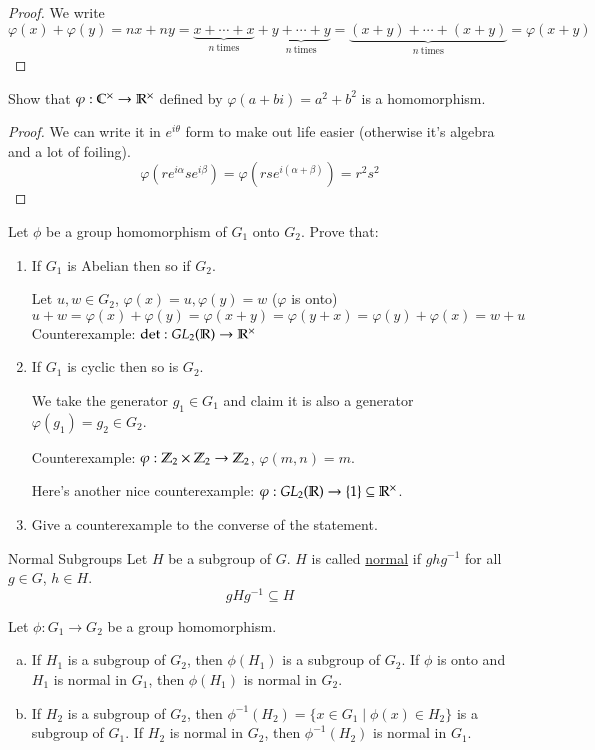 \begin{proof}
	We write
	\[\varphi(x)+\varphi(y) = nx + ny = \underbrace{x + \cdots + x}_{n\ \text{times}} + \underbrace{y + \cdots + y}_{n\ \text{times}} = \underbrace{(x+y) + \cdots + (x+y)}_{n\ \text{times}}=\varphi(x + y)\]
\end{proof}

 Show that $\varphi:\mathbb{C}^\times \to \mathbb{R}^\times$ defined by $\varphi(a+bi) = a^2+b^2$ is a homomorphism. 

\begin{proof}
We can write it in $e^{i\theta}$ form to make out life easier (otherwise it's algebra and a lot of foiling). 
\[\varphi(re^{i\alpha}se^{i\beta}) = \varphi(rs e^{i(\alpha+\beta)})=r^2s^2\]	
\end{proof}

 Let $\phi$ be a group homomorphism of $G_1$ onto $G_2$. Prove that: 

\begin{enumerate}
	\item If $G_1$ is Abelian then so if $G_2$. 
	
	Let $u,w\in G_2$, $\varphi(x)=u, \varphi(y)=w$ ($\varphi$ is onto)
	\[u+w = \varphi(x) + \varphi(y) = \varphi(x+y) = \varphi(y+x) = \varphi(y) + \varphi(x) =  w + u\]
	Counterexample: $\det : GL_2(\mathbb{R}) \to \mathbb{R}^\times$
	\item If $G_1$ is cyclic then so is $G_2$. 
	
	We take the generator $g_1\in G_1$ and claim it is also a generator $\varphi(g_1) = g_2\in G_2$. 
	
	Counterexample: $\varphi: \mathbb{Z}_2\times \mathbb{Z}_2\to \mathbb{Z}_2$, $\varphi(m,n) = m$. 
	
	Here's another nice counterexample: $\varphi: GL_2(\mathbb{R})\to \{1\}\subseteq \mathbb{R}^\times$. 
	\item Give a counterexample to the converse of the statement. 
\end{enumerate}

\begin{defn}{Normal Subgroups}
Let $H$ be a subgroup of $G$. $H$ is called \ul{normal} if $ghg^{-1}$ for all $g\in G$, $h\in H$. 
\begin{equation}
gHg^{-1}\subseteq H	
\end{equation}
\end{defn}

\begin{proposition}
	Let $\phi:G_1\to G_2$ be a group homomorphism. 
	\begin{enumerate}[(a)]
		\item If $H_1$ is a subgroup of $G_2$, then $\phi(H_1)$ is a subgroup of $G_2$. If $\phi$ is onto and $H_1$ is normal in $G_1$, then $\phi(H_1)$ is normal in $G_2$. 
		\item If $H_2$ is a subgroup of $G_2$, then $\phi^{-1}(H_2)=\{x\in G_1\mid \phi(x)\in H_2\}$ is a subgroup of $G_1$. If $H_2$ is normal in $G_2$, then $\phi^{-1}(H_2)$ is normal in $G_1$. 
	\end{enumerate}
\end{proposition}

